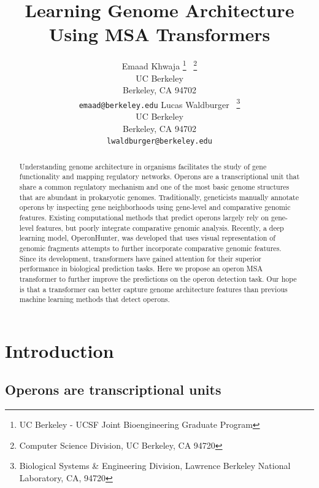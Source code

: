 \documentclass{article}
\title{Learning Genome Architecture Using MSA Transformers}
\begin{document}
\author{%
  Emaad Khwaja
  \thanks{UC Berkeley - UCSF Joint Bioengineering Graduate Program} \ \thanks{Computer Science Division, UC Berkeley, CA 94720} \\
  UC Berkeley\\
  Berkeley, CA 94702\\
  \texttt{emaad@berkeley.edu}
\And
  Lucas Waldburger \footnotemark[1] \ \thanks{Biological Systems \& Engineering Division, Lawrence Berkeley National Laboratory, CA, 94720} \\
  UC Berkeley\\
  Berkeley, CA 94702\\
  \texttt{lwaldburger@berkeley.edu}}

\maketitle
    
\begin{abstract}
Understanding genome architecture in organisms facilitates the study of gene functionality and mapping regulatory networks. Operons are a transcriptional unit that share a common regulatory mechanism and one of the most basic genome structures that are abundant in prokaryotic genomes. Traditionally, geneticists manually annotate operons by inspecting gene neighborhoods using gene-level and comparative genomic features. Existing computational methods that predict operons largely rely on gene-level features, but poorly integrate comparative genomic analysis. Recently, a deep learning model, OperonHunter, was developed that uses visual representation of genomic fragments attempts to further incorporate comparative genomic features. Since its development, transformers have gained attention for their superior performance in biological prediction tasks. Here we propose an operon MSA transformer to further improve the predictions on the operon detection task. Our hope is that a transformer can better capture genome architecture features than previous machine learning methods that detect operons.
\end{abstract}

\section{Introduction}

\subsection{Operons are transcriptional units}
\end{document}
